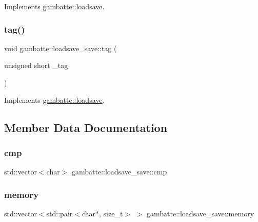 Implements \hyperlink{classgambatte_1_1loadsave_a0a05b67eadfbb26f654f3d5ec287c652}{gambatte\+::loadsave}.

\mbox{\label{classgambatte_1_1loadsave__save_a38e0327b81d707e1037e3f3ad523ffab}} 
\subsubsection{\texorpdfstring{tag()}{tag()}}
{\footnotesize\ttfamily void gambatte\+::loadsave\+\_\+save\+::tag (\begin{DoxyParamCaption}\item[{unsigned short}]{\+\_\+tag }\end{DoxyParamCaption})\hspace{0.3cm}{\ttfamily [virtual]}}



Implements \hyperlink{classgambatte_1_1loadsave_af4a635fc49c23e53e48b2b9d320aa165}{gambatte\+::loadsave}.



\subsection{Member Data Documentation}
\mbox{\label{classgambatte_1_1loadsave__save_a3cb41d0129c7b9eb133931cbde7ea7b3}} 
\subsubsection{\texorpdfstring{cmp}{cmp}}
{\footnotesize\ttfamily std\+::vector$<$char$>$ gambatte\+::loadsave\+\_\+save\+::cmp\hspace{0.3cm}{\ttfamily [private]}}

\mbox{\label{classgambatte_1_1loadsave__save_a3a7c1e5f98ab664b302f6b6b6f647e64}} 
\subsubsection{\texorpdfstring{memory}{memory}}
{\footnotesize\ttfamily std\+::vector$<$std\+::pair$<$char$\ast$, size\+\_\+t$>$ $>$ gambatte\+::loadsave\+\_\+save\+::memory\hspace{0.3cm}{\ttfamily [private]}}

